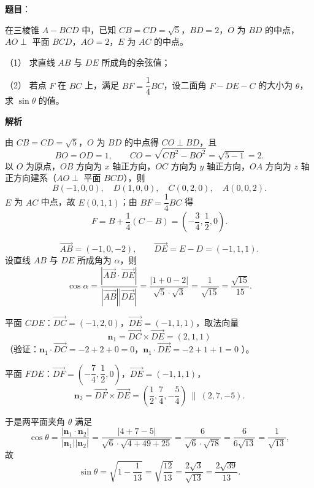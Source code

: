 \begin{answer}

\textbf{题目}：

在三棱锥 $A-BCD$ 中，已知 $CB=CD=\sqrt5$，$BD=2$，$O$ 为 $BD$ 的中点，$AO\perp$ 平面 $BCD$，$AO=2$，$E$ 为 $AC$ 的中点。

（1） 求直线 $AB$ 与 $DE$ 所成角的余弦值；

（2） 若点 $F$ 在 $BC$ 上，满足 $BF=\dfrac14BC$，设二面角 $F-DE-C$ 的大小为 $\theta$，求 $\sin\theta$ 的值。
\nopagebreak[4]
\begin{center}\end{center}
\nopagebreak[4]
\textbf{解析}

由 $CB=CD=\sqrt5$，$O$ 为 $BD$ 的中点得 $CO\perp BD$，且
\nopagebreak[4]
\[BO=OD=1,\qquad CO=\sqrt{CB^2-BO^2}=\sqrt{5-1}=2 .\]
以 $O$ 为原点，$OB$ 方向为 $x$ 轴正方向，$OC$ 方向为 $y$ 轴正方向，$OA$ 方向为 $z$ 轴正方向建系（$AO\perp$ 平面 $BCD$），则
\nopagebreak[4]
\[B(-1,0,0),\quad D(1,0,0),\quad C(0,2,0),\quad A(0,0,2).\]
$E$ 为 $AC$ 中点，故 $E(0,1,1)$；由 $BF=\dfrac14BC$ 得
\nopagebreak[4]
\[F=B+\frac14(C-B)=\left(-\frac34,\frac12,0\right).\]


\nopagebreak[4]
\[\overrightarrow{AB}=(-1,0,-2),\qquad \overrightarrow{DE}=E-D=(-1,1,1).\]
设直线 $AB$ 与 $DE$ 所成角为 $\alpha$，则
\nopagebreak[4]
\[\cos\alpha=\frac{\left|\overrightarrow{AB}\cdot\overrightarrow{DE}\right|}{\left|\overrightarrow{AB}\right|\left|\overrightarrow{DE}\right|}
=\frac{|1+0-2|}{\sqrt5\cdot\sqrt3}=\frac1{\sqrt{15}}=\frac{\sqrt{15}}{15}.\]


平面 $CDE$：$\overrightarrow{DC}=(-1,2,0)$，$\overrightarrow{DE}=(-1,1,1)$，取法向量
\nopagebreak[4]
\[\boldsymbol n_1=\overrightarrow{DC}\times\overrightarrow{DE}=(2,1,1)\]
（验证：$\boldsymbol n_1\cdot\overrightarrow{DC}=-2+2+0=0$，$\boldsymbol n_1\cdot\overrightarrow{DE}=-2+1+1=0$ ）。

平面 $FDE$：$\overrightarrow{DF}=\left(-\dfrac74,\dfrac12,0\right)$，$\overrightarrow{DE}=(-1,1,1)$，
\nopagebreak[4]
\[\boldsymbol n_2=\overrightarrow{DF}\times\overrightarrow{DE}=\left(\frac12,\frac74,-\frac54\right)\ \parallel\ (2,7,-5).\]

于是两平面夹角 $\theta$ 满足
\nopagebreak[4]
\[\cos\theta=\frac{\left|\boldsymbol n_1\cdot\boldsymbol n_2\right|}{\left|\boldsymbol n_1\right|\left|\boldsymbol n_2\right|}
=\frac{|4+7-5|}{\sqrt6\cdot\sqrt{4+49+25}}=\frac{6}{\sqrt6\cdot\sqrt{78}}=\frac{6}{6\sqrt{13}}=\frac1{\sqrt{13}},\]
故
\nopagebreak[4]
\[\sin\theta=\sqrt{1-\frac1{13}}=\sqrt{\frac{12}{13}}=\frac{2\sqrt3}{\sqrt{13}}=\frac{2\sqrt{39}}{13}.\]


\end{answer}
